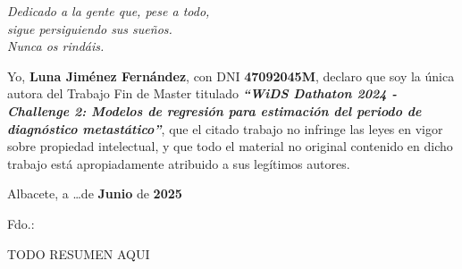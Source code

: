 %
% 



\cleardoublepage
\thispagestyle{empty}

\vspace*{9cm}  
\begin{flushright} \em 
Dedicado a la gente que, pese a todo,\\
sigue persiguiendo sus sueños.\\
Nunca os rindáis.
\end{flushright}


\cleardoublepage
\thispagestyle{plain}
\setcounter{page}{1} \null
\begin{center}
\Large{}
\end{center}
\vskip1cm

Yo, \textbf{Luna Jiménez Fernández}, con DNI \textbf{47092045M}, declaro que soy la única autora del Trabajo Fin de Master titulado \textbf{\textit{``WiDS Dathaton 2024 - Challenge 2: Modelos de regresión para estimación del periodo de diagnóstico metastático''}}, que el citado trabajo no infringe las leyes en vigor sobre propiedad intelectual, y que todo el material no original contenido en dicho trabajo está apropiadamente atribuido a sus legítimos autores.

\vspace*{2cm}
\begin{center}
Albacete, a \quad \ldots \quad de \textbf{Junio} de \textbf{2025}

\vskip3cm

Fdo.: \textbf{\autor}
\end{center}


\cleardoublepage
\thispagestyle{plain}
\begin{center}
\Large{}
\end{center}
\vskip1cm

TODO RESUMEN AQUI

\cleardoublepage
\thispagestyle{plain}
\begin{center}
	\Large{}
\end{center}
\vskip1cm

